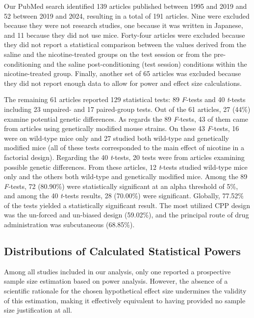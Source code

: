 \documentclass[authordate, meta]{jote-new-article}
\begin{document}
	Our PubMed search identified 139 articles published between 1995 and 2019 and 52 between 2019 and 2024, resulting in a total of 191 articles. Nine were excluded because they were not research studies, one because it was written in Japanese, and 11 because they did not use mice. Forty-four articles were excluded because they did not report a statistical comparison between the values derived from the saline and the nicotine-treated groups on the test session or from the pre-conditioning and the saline post-conditioning (test session) conditions within the nicotine-treated group. Finally, another set of 65 articles was excluded because they did not report enough data to allow for power and effect size calculations.



	The remaining 61 articles reported 129 statistical tests: 89 \emph{F}-tests and 40 \emph{t}-tests including 23 unpaired- and 17 paired-group tests. Out of the 61 articles, 27 (44\%) examine potential genetic differences. As regards the 89 \emph{F}-tests, 43 of them came from articles using genetically modified mouse strains. On these 43 \emph{F}-tests, 16 were on wild-type mice only and 27 studied both wild-type and genetically modified mice (all of these tests corresponded to the main effect of nicotine in a factorial design). Regarding the 40 \emph{t}-tests, 20 tests were from articles examining possible genetic differences. From these articles, 12 \emph{t}-tests studied wild-type mice only and the others both wild-type and genetically modified mice. Among the 89 \emph{F}-tests, 72 (80.90\%) were statistically significant at an alpha threshold of 5\%, and among the 40 \emph{t}-tests results, 28 (70.00\%) were significant. Globally, 77.52\% of the tests yielded a statistically significant result. The most utilized CPP design was the un-forced and un-biased design (59.02\%), and the principal route of drug administration was subcutaneous (68.85\%).



	\subsection{Distributions of Calculated Statistical Powers}



	Among all studies included in our analysis, only one reported a prospective sample size estimation based on power analysis. However, the absence of a scientific rationale for the chosen hypothetical effect size undermines the validity of this estimation, making it effectively equivalent to having provided no sample size justification at all.
\end{document}
